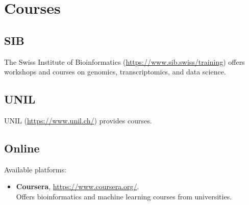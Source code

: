 \section{Courses}
\subsection{SIB}
The Swiss Institute of Bioinformatics (\url{https://www.sib.swiss/training}) offers workshops and courses on genomics, transcriptomics, and data science.

\subsection{UNIL}
UNIL (\url{https://www.unil.ch/}) provides courses.

\subsection{Online}
Available platforms:
\begin{itemize}
    \item \textbf{Coursera}, \url{https://www.coursera.org/}.\\
    Offers bioinformatics and machine learning courses from universities.
\end{itemize}